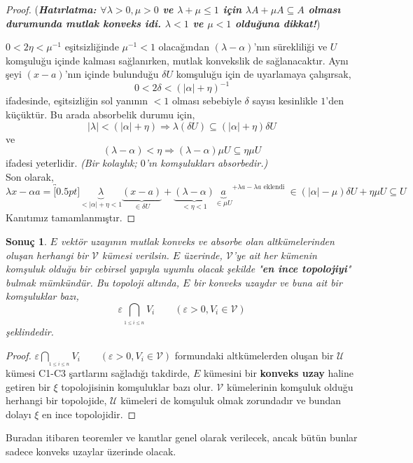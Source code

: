 \documentclass[11pt]{article}
\theoremstyle{plain}
\newtheorem{corollary}{Sonuç}
\theoremstyle{definition}
\theoremstyle{remark}
\numberwithin{equation}{section}
\renewcommand{\%}{{\small \%}}
\begin{document}
\begin{proof}
 (\emph{\textbf{Hatırlatma: $\forall\lambda>0, \mu>0$ ve $\lambda+\mu\leq 1$ için $\lambda A+\mu A\subseteq A$ olması durumunda mutlak konveks idi. $\lambda<1$ ve $\mu<1$ olduğuna dikkat!}})


$0<2\eta<\mu^{-1}$ eşitsizliğinde $\mu^{-1}<1$ olacağından $(\lambda-\alpha)$'nın sürekliliği ve $U$ komşuluğu içinde kalması sağlanırken, mutlak konvekslik de sağlanacaktır.  Aynı şeyi $(x-a)$'nın içinde bulunduğu $\delta U$ komşuluğu için de uyarlamaya çalışırsak, \[0<2\delta<(|\alpha|+\eta)^{-1}\] ifadesinde, eşitsizliğin sol yanının $<1$ olması sebebiyle $\delta$ sayısı kesinlikle $1$'den küçüktür. Bu arada absorbelik durumu için,
\[
|\lambda|<(|\alpha|+\eta)\Rightarrow\lambda\left(\delta U\right)\subseteq(|\alpha|+\eta)\delta U
\] ve
\[
(\lambda-\alpha)<\eta\Rightarrow(\lambda-\alpha)\mu U\subseteq\eta\mu U
\]ifadesi yeterlidir. \emph{(Bir kolaylık; $0$'ın komşulukları absorbedir.)}\\ Son olarak,
\[
\lambda x-\alpha a=\overbracket[0.5pt]{\underbrace{\lambda}_{<|\alpha|+\eta<1}\underbrace{(x-a)}_{\in\delta U}+\underbrace{(\lambda-\alpha)}_{<\eta<1}\underbrace{a}_{\in\mu U}}^{+\lambda a-\lambda a \text{ eklendi }}\in(|\alpha|-\mu)\delta U+\eta\mu U\subseteq U
\]Kanıtımız tamamlanmıştır.

\end{proof}
\newpage
\begin{corollary}
$E$ vektör uzayının mutlak konveks ve absorbe olan altkümelerinden oluşan herhangi bir $\mathscr{V}$ kümesi verilsin. $E$ üzerinde, $\mathscr{V}$'ye ait her kümenin komşuluk olduğu bir cebirsel yapıyla uyumlu olacak şekilde "\textbf{en ince topolojiyi}" bulmak mümkündür. Bu topoloji altında, $E$ bir konveks uzaydır ve buna ait bir komşuluklar bazı,
\[
\varepsilon\bigcap_{_{1\leq i\leq n}}V_i\qquad (\varepsilon>0, V_i \in \mathscr{V})
\]şeklindedir.
\end{corollary}

\begin{proof}
$\varepsilon\bigcap_{_{1\leq i\leq n}}V_i\qquad (\varepsilon>0, V_i \in \mathscr{V})$ formundaki altkümelerden oluşan bir $\mathscr{U}$ kümesi C1-C3 şartlarını sağladığı takdirde, $E$ kümesini bir \textbf{konveks uzay} haline getiren bir $\xi$ topolojisinin komşuluklar bazı olur. $\mathscr{V}$ kümelerinin komşuluk olduğu herhangi bir topolojide, $\mathscr{U}$ kümeleri de komşuluk olmak zorundadır ve bundan dolayı $\xi$ en ince topolojidir.
\end{proof}

Buradan itibaren teoremler ve kanıtlar genel olarak verilecek, ancak bütün bunlar sadece konveks uzaylar üzerinde olacak.
\end{document}
